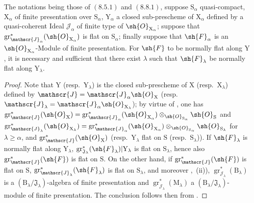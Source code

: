 \begin{proposition}[11.3.6]
\label{IV.11.3.6}
The notations being those of $(8.5.1)$ and $(8.8.1)$, suppose $\mathrm{S}_\alpha$ quasi-compact, $\mathrm{X}_\alpha$ of finite presentation over $\mathrm{S}_\alpha$, $\mathrm{Y}_\alpha$ a closed sub-prescheme of $\mathrm{X}_\alpha$ defined by a quasi-coherent Ideal $\mathscr{J}_\alpha$ of finite type of $\sh{O}_{\mathrm{X}_\alpha}$; suppose that $\operatorname{gr}^*_{\mathscr{J}_\alpha}(\sh{O}_{\mathrm{X}_\alpha})$ is flat on $\mathrm{S}_\alpha$; finally suppose that $\sh{F}_\alpha$ is an $\sh{O}_{\mathrm{X}_\alpha}$-Module of finite presentation. For $\sh{F}$ to be normally flat along $\mathrm{Y}$, it is necessary and sufficient that there exist $\lambda$ such that $\sh{F}_\lambda$ be normally flat along $\mathrm{Y}_\lambda$.
\end{proposition}

\begin{proof}
Note that $\mathrm{Y}$ (resp.\ $\mathrm{Y}_\lambda$) is the closed sub-prescheme of $\mathrm{X}$ (resp.\ $\mathrm{X}_\lambda$) defined by $\mathscr{J}=\mathscr{J}_\alpha\sh{O}_{\mathrm{X}}$ (resp.\ $\mathscr{J}_\lambda=\mathscr{J}_\alpha\sh{O}_{\mathrm{X}_\lambda}$); by virtue of , one has $\operatorname{gr}^*_\mathscr{J}(\sh{O}_\mathrm{X})=\operatorname{gr}^*_{\mathscr{J}_\alpha}(\sh{O}_{\mathrm{X}_\alpha})\otimes_{\sh{O}_{\mathrm{S}_\alpha}}\sh{O}_\mathrm{S}$ and $\operatorname{gr}^*_{\mathscr{J}_\lambda}(\sh{O}_{\mathrm{X}_\lambda})=\operatorname{gr}^*_{\mathscr{J}_\alpha}(\sh{O}_{\mathrm{X}_\alpha})\otimes_{\sh{O}_{\mathrm{S}_\alpha}}\sh{O}_{\mathrm{S}_\lambda}$ for $\lambda\geqslant\alpha$, and $\operatorname{gr}^*_\mathscr{J}(\sh{O}_\mathrm{X})$ (resp.\ $\mathrm{Y}_\lambda$ flat on $\mathrm{S}$ (resp.\ $\mathrm{S}_\lambda$)). If $\sh{F}_\lambda$ is normally flat along $\mathrm{Y}_\lambda$, $\operatorname{gr}^*_{\mathfrak{J}_\lambda}(\sh{F}_\lambda)|\mathrm{Y}_\lambda$ is flat on $\mathrm{S}_\lambda$, hence also $\operatorname{gr}^*_\mathscr{J}(\sh{F})$ is flat on $\mathrm{S}$. On the other hand, if $\operatorname{gr}^*_\mathscr{J}(\sh{F})$ is flat on $\mathrm{S}$, $\operatorname{gr}^*_{\mathscr{J}_\lambda}(\sh{F}_\lambda)$ is flat on $\mathrm{S}_\lambda$, and moreover ,~(ii)), $\operatorname{gr}^*_{\mathscr{J}_\lambda}(\mathrm{B}_\lambda)$ is a $(\mathrm{B}_\lambda/\mathfrak{J}_\lambda)$-algebra of finite presentation and $\operatorname{gr}^*_{\mathscr{J}_\lambda}(\mathrm{M}_\lambda)$ a $(\mathrm{B}_\lambda/\mathfrak{J}_\lambda)$-module of finite presentation. The conclusion follows then from .
\end{proof}

